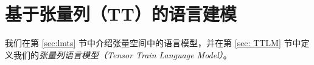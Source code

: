 \section{基于张量列（TT）的语言建模}
\label{sec:ttlm}

我们在第 \ref{sec:lmts} 节中介绍张量空间中的语言模型，并在第 \ref{sec: TTLM} 节中定义我们的\emph{张量列语言模型（Tensor Train Language Model）}。



